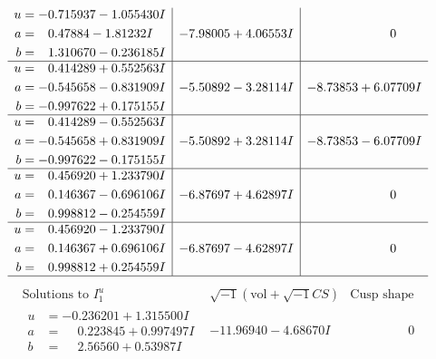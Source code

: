 \documentclass[1p]{elsarticle_modified}
\theoremstyle{definition}
\newcommand{\I}{\sqrt{-1}}
\begin{document}
$$\begin{array}{c|c|c}
\begin{aligned}
u &= -0.715937 - 1.055430 I \\
a &= \phantom{-}0.47884 - 1.81232 I \\
b &= \phantom{-}1.310670 - 0.236185 I\end{aligned}
 & -7.98005 + 4.06553 I & \phantom{-0.000000 } 0 \\ \hline\begin{aligned}
u &= \phantom{-}0.414289 + 0.552563 I \\
a &= -0.545658 - 0.831909 I \\
b &= -0.997622 + 0.175155 I\end{aligned}
 & -5.50892 - 3.28114 I & -8.73853 + 6.07709 I \\ \hline\begin{aligned}
u &= \phantom{-}0.414289 - 0.552563 I \\
a &= -0.545658 + 0.831909 I \\
b &= -0.997622 - 0.175155 I\end{aligned}
 & -5.50892 + 3.28114 I & -8.73853 - 6.07709 I \\ \hline\begin{aligned}
u &= \phantom{-}0.456920 + 1.233790 I \\
a &= \phantom{-}0.146367 - 0.696106 I \\
b &= \phantom{-}0.998812 - 0.254559 I\end{aligned}
 & -6.87697 + 4.62897 I & \phantom{-0.000000 } 0 \\ \hline\begin{aligned}
u &= \phantom{-}0.456920 - 1.233790 I \\
a &= \phantom{-}0.146367 + 0.696106 I \\
b &= \phantom{-}0.998812 + 0.254559 I\end{aligned}
 & -6.87697 - 4.62897 I & \phantom{-0.000000 } 0\\
 \hline 
 \end{array}$$\newpage$$\begin{array}{c|c|c}  
\text{Solutions to }I^u_{1}& \I (\text{vol} + \sqrt{-1}CS) & \text{Cusp shape}\\
 \hline 
\begin{aligned}
u &= -0.236201 + 1.315500 I \\
a &= \phantom{-}0.223845 + 0.997497 I \\
b &= \phantom{-}2.56560 + 0.53987 I\end{aligned}
 & -11.96940 - 4.68670 I & \phantom{-0.000000 } 0 \\ \hline\begin{aligned}

\end{aligned}
\end{array}$$
\end{document}
